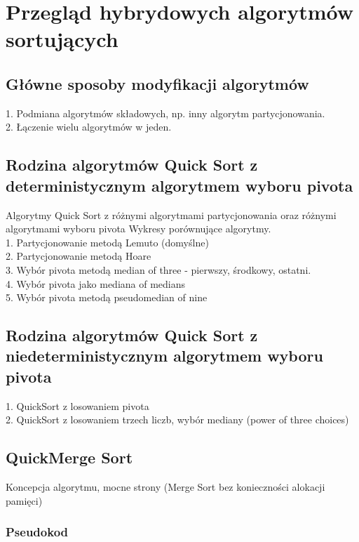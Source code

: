 \chapter{Przegląd hybrydowych algorytmów sortujących}
\thispagestyle{chapterBeginStyle}

\section{Główne sposoby modyfikacji algorytmów}
1. Podmiana algorytmów składowych, np. inny algorytm partycjonowania.\\
2. Łączenie wielu algorytmów w jeden.

\section{Rodzina algorytmów Quick Sort z deterministycznym algorytmem wyboru pivota}
Algorytmy Quick Sort z różnymi algorytmami partycjonowania oraz różnymi algorytmami wyboru pivota
Wykresy porównujące algorytmy.\\
1. Partycjonowanie metodą Lemuto (domyślne)\\
2. Partycjonowanie metodą Hoare\\
3. Wybór pivota metodą median of three - pierwszy, środkowy, ostatni.\\
4. Wybór pivota jako mediana of medians\\
5. Wybór pivota metodą pseudomedian of nine\\


\section{Rodzina algorytmów Quick Sort z niedeterministycznym algorytmem wyboru pivota}
1. QuickSort z losowaniem pivota\\
2. QuickSort z losowaniem trzech liczb, wybór mediany (power of three choices)\\

\section{QuickMerge Sort}
Koncepcja algorytmu, mocne strony (Merge Sort bez konieczności alokacji pamięci)

\subsection{Pseudokod}

